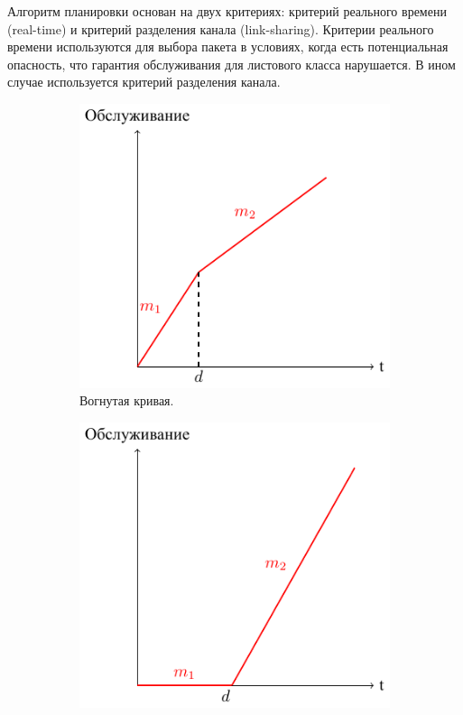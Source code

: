         Алгоритм планировки основан на двух критериях: критерий реального времени
        (real-time) и критерий разделения канала (link-sharing). Критерии реального времени
        используются для выбора пакета в условиях, когда есть потенциальная опасность,
        что гарантия обслуживания для листового класса нарушается. В ином случае
        используется критерий разделения канала.\cite{tchfsc}

		\begin{figure}[ht!]
		 	\center
            \begin{subfigure}[b]{0.3\textwidth}
                \includegraphics[width=\textwidth]{pdfimages/hfsc_concave.pdf}
                \caption{Вогнутая кривая.}
                \label{pic:hfsc_concave}
            \end{subfigure}
            \hspace{0.2\textwidth}
            \begin{subfigure}[b]{0.3\textwidth}
                \includegraphics[width=\textwidth]{pdfimages/hfsc_convex.pdf}

\end{subfigure}
\end{figure}

